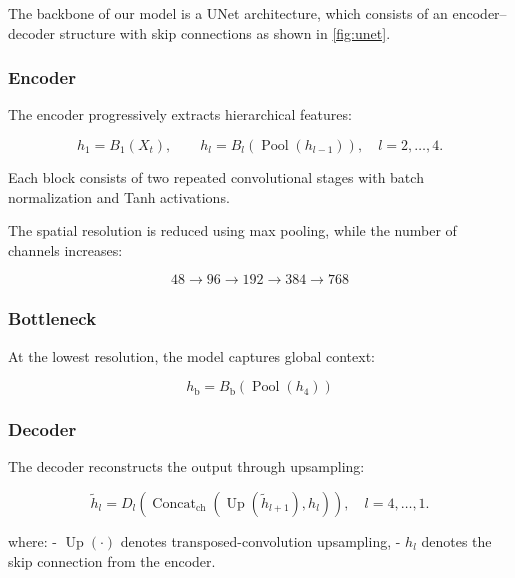 \documentclass[
]{article}
\begin{document}
The backbone of our model is a UNet architecture, which consists of an
encoder--decoder structure with skip connections as shown in
\autoref{fig:unet}.

\subsubsection{Encoder}\label{encoder}

The encoder progressively extracts hierarchical features:

\begin{equation}
h_1 = B_1(X_t), \qquad h_l = B_l(\operatorname{Pool}(h_{l-1})), \quad l = 2,\ldots,4.
\end{equation}

Each block consists of two repeated convolutional stages with batch
normalization and Tanh activations.

The spatial resolution is reduced using max pooling, while the number of
channels increases:

\begin{equation}
48 \rightarrow 96 \rightarrow 192 \rightarrow 384 \rightarrow 768
\end{equation}

\subsubsection{Bottleneck}\label{bottleneck}

At the lowest resolution, the model captures global context:

\begin{equation}
h_{\mathrm{b}} = B_{\mathrm{b}}(\operatorname{Pool}(h_4))
\end{equation}

\subsubsection{Decoder}\label{decoder}

The decoder reconstructs the output through upsampling:

\begin{equation}
\tilde{h}_l = D_l(\operatorname{Concat}_{\mathrm{ch}}(\operatorname{Up}(\tilde{h}_{l+1}), h_l)), \quad l = 4,\ldots,1.
\end{equation}

where: - \(\operatorname{Up}(\cdot)\) denotes transposed-convolution
upsampling, - \(h_l\) denotes the skip connection from the encoder.
\end{document}
